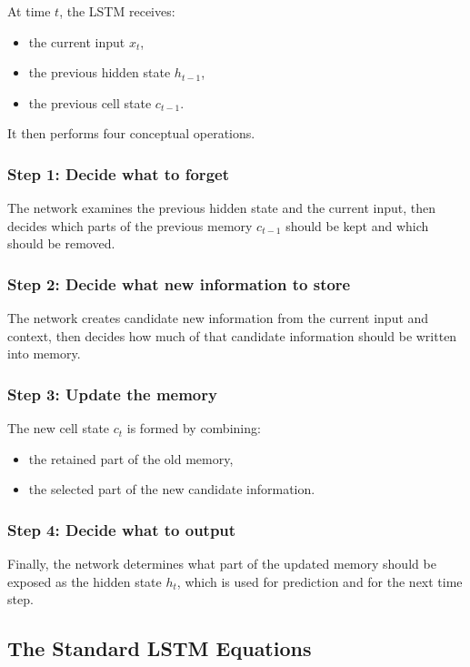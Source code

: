 At time \(t\), the LSTM receives:
\begin{itemize}
    \item the current input \(x_t\),
    \item the previous hidden state \(h_{t-1}\),
    \item the previous cell state \(c_{t-1}\).
\end{itemize}

It then performs four conceptual operations.

\subsubsection*{Step 1: Decide what to forget}

The network examines the previous hidden state and the current input, then decides which parts of the previous memory \(c_{t-1}\) should be kept and which should be removed.

\subsubsection*{Step 2: Decide what new information to store}

The network creates candidate new information from the current input and context, then decides how much of that candidate information should be written into memory.

\subsubsection*{Step 3: Update the memory}

The new cell state \(c_t\) is formed by combining:
\begin{itemize}
    \item the retained part of the old memory,
    \item the selected part of the new candidate information.
\end{itemize}

\subsubsection*{Step 4: Decide what to output}

Finally, the network determines what part of the updated memory should be exposed as the hidden state \(h_t\), which is used for prediction and for the next time step.

\subsection{The Standard LSTM Equations}

